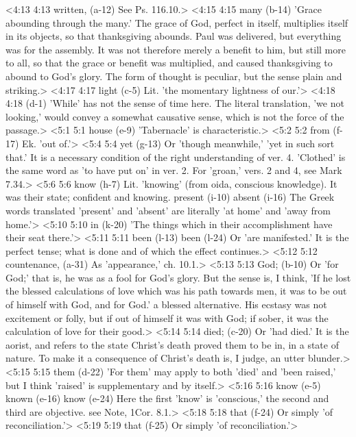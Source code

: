 <4:13 4:13  written, (a-12)  See Ps. 116.10.>
<4:15 4:15  many (b-14)  'Grace abounding through the many.' The grace of God, perfect  in itself, multiplies itself in its objects, so that  thanksgiving abounds. Paul was delivered, but everything was  for the assembly. It was not therefore merely a benefit to him,  but still more to all, so that the grace or benefit was  multiplied, and caused thanksgiving to abound to God's glory.  The form of thought is peculiar, but the sense plain and  striking.>
<4:17 4:17  light (c-5)  Lit. 'the momentary lightness of our.'>
<4:18 4:18   (d-1)  'While' has not the sense of time here. The literal  translation, 'we not looking,' would convey a somewhat  causative sense, which is not the force of the passage.>
<5:1 5:1  house (e-9)  'Tabernacle' is characteristic.>
<5:2 5:2  from (f-17)  Ek. 'out of.'>
<5:4 5:4  yet (g-13)  Or 'though meanwhile,' 'yet in such sort that.' It is a  necessary condition of the right understanding of ver. 4.  'Clothed' is the same word as 'to have put on' in ver. 2. For  'groan,' vers. 2 and 4, see Mark 7.34.>
<5:6 5:6  know (h-7)  Lit. 'knowing' (from oida, conscious knowledge). It was  their state; confident and knowing.
  present (i-10)  absent (i-16)
  The Greek words translated 'present' and 'absent' are  literally 'at home' and 'away from home.'>
<5:10 5:10  in (k-20)  'The things which in their accomplishment have their seat  there.'>
<5:11 5:11  been (l-13)  been (l-24)
  Or 'are manifested.' It is the perfect tense; what is done  and of which the effect continues.>
<5:12 5:12  countenance, (a-31)  As 'appearance,' ch. 10.1.>
<5:13 5:13  God; (b-10)  Or 'for God;' that is, he was as a fool for God's glory. But  the sense is, I think, 'If he lost the blessed calculations of  love which was his path towards men, it was to be out of  himself with God, and for God.' a blessed alternative. His  ecstasy was not excitement or folly, but if out of himself it  was with God; if sober, it was the calculation of love for  their good.>
<5:14 5:14  died; (c-20)  Or 'had died.' It is the aorist, and refers to the state  Christ's death proved them to be in, in a state of nature. To  make it a consequence of Christ's death is, I judge, an utter  blunder.>
<5:15 5:15  them (d-22)  'For them' may apply to both 'died' and 'been raised,' but I  think 'raised' is supplementary and by itself.>
<5:16 5:16  know (e-5)  known (e-16)  know (e-24)
  Here the first 'know' is 'conscious,' the second and third  are objective. see Note, 1Cor. 8.1.>
<5:18 5:18  that (f-24) Or simply 'of reconciliation.'>
<5:19 5:19  that (f-25)  Or simply 'of reconciliation.'>
